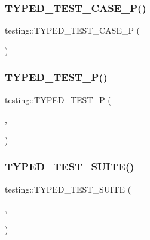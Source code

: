 \mbox{\label{namespacetesting_a439eefbc85668f74fd9e0c2cb7c7d0b0}} 
\subsubsection{\texorpdfstring{TYPED\_TEST\_CASE\_P()}{TYPED\_TEST\_CASE\_P()}}
{\footnotesize\ttfamily testing\+::\+T\+Y\+P\+E\+D\+\_\+\+T\+E\+S\+T\+\_\+\+C\+A\+S\+E\+\_\+P (\begin{DoxyParamCaption}\item[{\mbox{\hyperlink{classtesting_1_1_code_location_for_t_y_p_e_d_t_e_s_t_p}{Code\+Location\+For\+T\+Y\+P\+E\+D\+T\+E\+S\+TP}}}]{ }\end{DoxyParamCaption})}

\mbox{\label{namespacetesting_a3f3fbbc7ecc23117307b81deb8f4cfac}} 
\subsubsection{\texorpdfstring{TYPED\_TEST\_P()}{TYPED\_TEST\_P()}}
{\footnotesize\ttfamily testing\+::\+T\+Y\+P\+E\+D\+\_\+\+T\+E\+S\+T\+\_\+P (\begin{DoxyParamCaption}\item[{\mbox{\hyperlink{classtesting_1_1_code_location_for_t_y_p_e_d_t_e_s_t_p}{Code\+Location\+For\+T\+Y\+P\+E\+D\+T\+E\+S\+TP}}}]{,  }\item[{Verify}]{ }\end{DoxyParamCaption})}

\mbox{\label{namespacetesting_a47a357ed1077c1b52ba654b7753714bc}} 
\subsubsection{\texorpdfstring{TYPED\_TEST\_SUITE()}{TYPED\_TEST\_SUITE()}}
{\footnotesize\ttfamily testing\+::\+T\+Y\+P\+E\+D\+\_\+\+T\+E\+S\+T\+\_\+\+S\+U\+I\+TE (\begin{DoxyParamCaption}\item[{\mbox{\hyperlink{classtesting_1_1_code_location_for_t_y_p_e_d_t_e_s_t}{Code\+Location\+For\+T\+Y\+P\+E\+D\+T\+E\+ST}}}]{,  }\item[{int}]{ }\end{DoxyParamCaption})}

